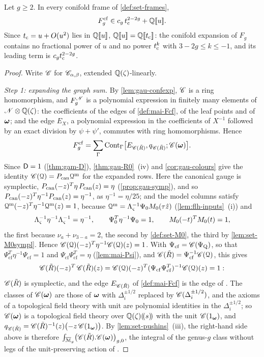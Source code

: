 \begin{cor}
\label{cor:mai-gap}
Let $g\geq2$. In every conifold frame of \cref{def:set-frames},
\[
F_g^{\mathrm{cf}}\in c_g\,t_{\mathrm{c}}^{2-2g}+\mathbb{Q}[\![ u ]\!].
\]
Since $t_{\mathrm{c}}=u+O(u^2)$ lies in $\mathbb{Q}[\![ u ]\!]$, $\mathbb{Q}[\![ u ]\!]=\mathbb{Q}[\![ t_{\mathrm{c}} ]\!]$: the conifold expansion of $F_g$ contains no fractional power of $u$ and no power $t_{\mathrm{c}}^k$ with $3-2g\leq k\leq-1$, and its leading term is $c_gt_{\mathrm{c}}^{2-2g}$.
\end{cor}

\begin{proof}
Write $\mathscr{C}$ for $\mathscr{C}_{\alpha,\beta}$, extended $\mathbb{Q}(\zeta)$-linearly.

\emph{Step 1: expanding the graph sum.} By \cref{lem:gau-confexp}, $\mathscr{C}$ is a ring homomorphism, and $F_g^{\mathscr{N}}$ is a polynomial expression in finitely many elements of $\mathscr{N}\otimes\mathbb{Q}(\zeta)$: the coefficients of the edges of \cref{def:mai-Fcf}, of the leaf points and of $\boldsymbol{\omega}$; and the edge $E_X$, a polynomial expression in the coefficients of $X^{-1}$ followed by an exact division by $\psi+\psi'$, commutes with ring homomorphisms. Hence
\[
F_g^{\mathrm{cf}}=\sum_\Gamma\mathrm{Cont}_\Gamma\bigl[E_{\mathscr{C}(\tilde R)},q_{\mathscr{C}(\tilde R)};\mathscr{C}(\boldsymbol{\omega})\bigr].
\]
Since $\mathsf{D}=1$ (\cref{thm:gam-D}), \cref{thm:gau-R0}~(iv) and \cref{cor:gau-colours} give the identity $\mathscr{C}(\mathcal{Q})=P_{\mathrm{can}}\mathcal{Q}^{\mathrm m}$ for the expanded rows. Here the canonical gauge is symplectic, $P_{\mathrm{can}}(-z)^T\eta\,P_{\mathrm{can}}(z)=\eta$ (\cref{prop:gau-symp}), and so $P_{\mathrm{can}}(-z)^T\eta^{-1}P_{\mathrm{can}}(z)=\eta^{-1}$, as $\eta^{-1}=\eta/25$; and the model columns satisfy $\mathcal{Q}^{\mathrm m}(-z)^T\eta^{-1}\mathcal{Q}^{\mathrm m}(z)=1$, because $\mathcal{Q}^{\mathrm m}=\Lambda_\varsigma^{-1}\Psi_0M_{0}(\tau\hat{z})$ (\cref{lem:flh-inputs}~(i)) and
\[
\Lambda_\varsigma^{-1}\eta^{-1}\Lambda_\varsigma^{-1}=\eta^{-1},\qquad \Psi_0^T\eta^{-1}\Psi_0=1,\qquad M_{0}(-t)^TM_{0}(t)=1,
\]
the first because $\nu_a+\nu_{3-a}=2$, the second by \cref{def:set-M0}, the third by \cref{lem:set-M0sympl}. Hence $\mathscr{C}(\mathcal{Q})(-z)^T\eta^{-1}\mathscr{C}(\mathcal{Q})(z)=1$. With $\Psi_{\mathrm{cf}}=\mathscr{C}(\Psi_{\mathrm Q})$, so that $\Psi_{\mathrm{cf}}^T\eta^{-1}\Psi_{\mathrm{cf}}=1$ and $\Psi_{\mathrm{cf}}\Psi_{\mathrm{cf}}^T=\eta$ (\cref{lem:mai-Psi}), and $\mathscr{C}(\tilde R)=\Psi_{\mathrm{cf}}^{-1}\mathscr{C}(\mathcal{Q})$, this gives
\[
\mathscr{C}(\tilde R)(-z)^T\,\mathscr{C}(\tilde R)(z)=\mathscr{C}(\mathcal{Q})(-z)^T(\Psi_{\mathrm{cf}}\Psi_{\mathrm{cf}}^T)^{-1}\mathscr{C}(\mathcal{Q})(z)=1 :
\]
$\mathscr{C}(\tilde R)$ is symplectic, and the edge $E_{\mathscr{C}(\tilde R)}$ of \cref{def:mai-Fcf} is the edge of \cite[Def.~2.2]{PPZ15}. The classes of $\mathscr{C}(\boldsymbol{\omega})$ are those of $\boldsymbol{\omega}$ with $\Delta_i^{\pm1/2}$ replaced by $\mathscr{C}(\Delta_i^{\pm1/2})$, and the axioms of a topological field theory with unit are polynomial identities in the $\Delta_i^{\pm1/2}$; so $\mathscr{C}(\boldsymbol{\omega})$ is a topological field theory over $\mathbb{Q}(\zeta)(\!(s)\!)$ with the unit $\mathscr{C}(1_{\boldsymbol{\omega}})$, and $q_{\mathscr{C}(\tilde R)}=\mathscr{C}(\tilde R)^{-1}(z)\bigl(-z\,\mathscr{C}(1_{\boldsymbol{\omega}})\bigr)$. By \cref{lem:set-pushins}~(iii), the right-hand side above is therefore $\int_{\overline{\mathcal M}_g}\bigl(\mathscr{C}(\tilde R).\mathscr{C}(\boldsymbol{\omega})\bigr)_{g,0}$, the integral of the genus-$g$ class without legs of the unit-preserving action of \cite[Def.~2.13]{PPZ15}.


\end{proof}
